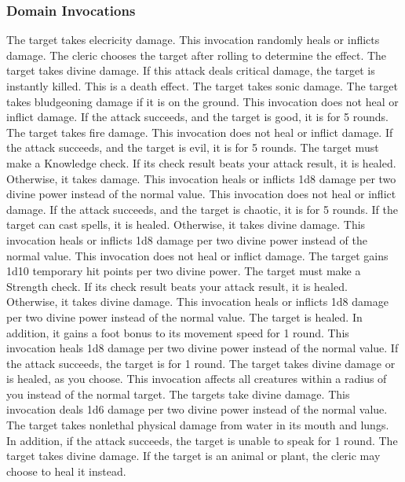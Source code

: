 \subsubsection{Domain Invocations}\label{Domain Invocations}

The target takes elecricity damage.
This invocation randomly heals or inflicts damage.
The cleric chooses the target after rolling to determine the effect.
The target takes divine damage.
If this attack deals critical damage, the target is instantly killed.
This is a death effect.
The target takes sonic damage.
The target takes bludgeoning damage if it is on the ground.
This invocation does not heal or inflict damage.
If the attack succeeds, and the target is good, it is \staggered for 5 rounds.
The target takes fire damage.
This invocation does not heal or inflict damage.
If the attack succeeds, and the target is evil, it is \dazed for 5 rounds.
The target must make a Knowledge check.
If its check result beats your attack result, it is healed.
Otherwise, it takes damage.
This invocation heals or inflicts 1d8 damage per two divine power instead of the normal value.
This invocation does not heal or inflict damage.
If the attack succeeds, and the target is chaotic, it is \immobilized for 5 rounds.
If the target can cast spells, it is healed.
Otherwise, it takes divine damage.
This invocation heals or inflicts 1d8 damage per two divine power instead of the normal value.
This invocation does not heal or inflict damage.
The target gains 1d10 temporary hit points per two divine power.
The target must make a Strength check.
If its check result beats your attack result, it is healed.
Otherwise, it takes divine damage.
This invocation heals or inflicts 1d8 damage per two divine power instead of the normal value.
The target is healed.
In addition, it gains a  foot bonus to its movement speed for 1 round.
This invocation heals 1d8 damage per two divine power instead of the normal value.
If the attack succeeds, the target is \disoriented for 1 round.
The target takes divine damage or is healed, as you choose.
This invocation affects all creatures within a \areasmall radius of you instead of the normal target.
The targets take divine damage.
This invocation deals 1d6 damage per two divine power instead of the normal value.
The target takes nonlethal physical damage from water in its mouth and lungs.
In addition, if the attack succeeds, the target is unable to speak for 1 round.
The target takes divine damage.
If the target is an animal or plant, the cleric may choose to heal it instead.

